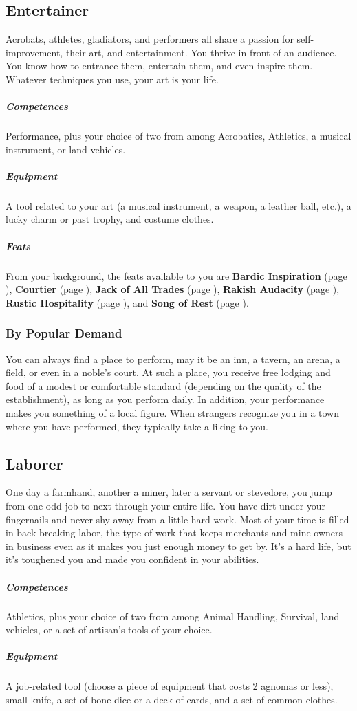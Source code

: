 \subsection*{Entertainer} \label{ssec::entertainer}
    Acrobats, athletes, gladiators, and performers all share a passion for self-improvement, their art, and entertainment. %
    You thrive in front of an audience.
    You know how to entrance them, entertain them, and even inspire them.
    Whatever techniques you use, your art is your life.

    \subparagraph{Competences} Performance, plus your choice of two from among Acrobatics, Athletics, a musical instrument, or land vehicles.

    \subparagraph{Equipment} A tool related to your art (a musical instrument, a weapon, a leather ball, etc.), a lucky charm or past trophy, and costume clothes.

    \subparagraph{Feats} From your background, the feats available to you are
    \textbf{Bardic Inspiration} (page \pageref{feat::bardicinspiration}),
    \textbf{Courtier} (page \pageref{feat::courtier}),
    \textbf{Jack of All Trades} (page \pageref{feat::jackofalltrades}),
    \textbf{Rakish Audacity} (page \pageref{feat::rakishaudacity}),
    \textbf{Rustic Hospitality} (page \pageref{feat::rustichospitality}), and
    \textbf{Song of Rest} (page \pageref{feat::songofrest}).

    \subsubsection{By Popular Demand} \label{feat::bypopulardemand}
        You can always find a place to perform, may it be an inn, a tavern, an arena, a field, or even in a noble's court.
        At such a place, you receive free lodging and food of a modest or comfortable standard (depending on the quality of the establishment), as long as you perform daily.
        In addition, your performance makes you something of a local figure.
        When strangers recognize you in a town where you have performed, they typically take a liking to you.

\subsection*{Laborer} \label{ssec::laborer}
    One day a farmhand, another a miner, later a servant or stevedore, you jump from one odd job to next through your entire life.
    You have dirt under your fingernails and never shy away from a little hard work.
    Most of your time is filled in back-breaking labor, the type of work that keeps merchants and mine owners in business even as it makes you just enough money to get by.
    It’s a hard life, but it’s toughened you and made you confident in your abilities.
    \subparagraph{Competences} Athletics, plus your choice of two from among Animal Handling, Survival, land vehicles, or a set of artisan's tools of your choice.
    \subparagraph{Equipment} A job-related tool (choose a piece of equipment that costs 2 agnomas or less), small knife, a set of bone dice or a deck of cards, and a set of common clothes.
